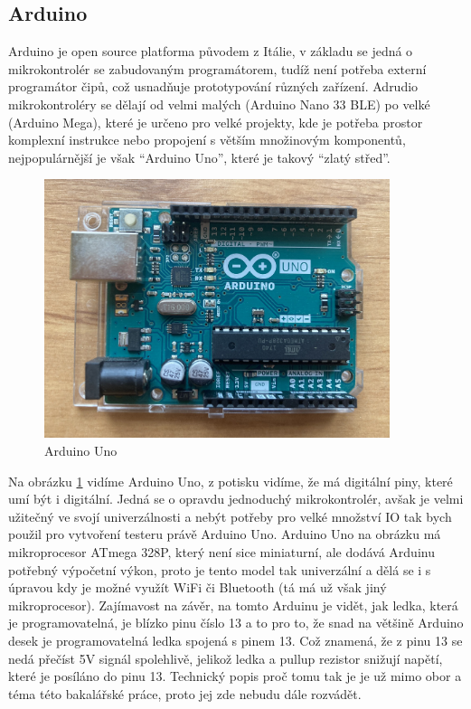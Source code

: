 
\subsection{Arduino}
Arduino je open source platforma původem z Itálie, v základu se jedná o mikrokontrolér se zabudovaným programátorem, tudíž není potřeba externí programátor čipů, což usnadňuje prototypování různých zařízení. Adrudio mikrokontroléry se dělají od velmi malých (Arduino Nano 33 BLE) po velké (Arduino Mega), které je určeno pro velké projekty, kde je potřeba prostor komplexní instrukce nebo propojení s větším množinovým komponentů, nejpopulárnější je však “Arduino Uno”, které je takový “zlatý střed”.

\begin{figure}[h!]
	\centering
	\includegraphics[width=0.9\textwidth]{pictures/arduino.jpeg}
    	\caption{Arduino Uno}
   	\label{fig:arduinoUno}
\end{figure}	

Na obrázku \ref{fig:arduinoUno} vidíme Arduino Uno, z potisku vidíme, že má digitální piny, které umí být i digitální. Jedná se o opravdu jednoduchý mikrokontrolér, avšak je velmi užitečný ve svojí univerzálnosti a nebýt potřeby pro velké množství IO tak bych použil pro vytvoření testeru právě Arduino Uno. Arduino Uno na obrázku má mikroprocesor ATmega 328P, který není sice miniaturní, ale dodává Arduinu potřebný výpočetní výkon, proto je tento model tak univerzální a dělá se i s úpravou kdy je možné využít WiFi či Bluetooth (tá má už však jiný mikroprocesor). Zajímavost na závěr, na tomto Arduinu je vidět, jak ledka, která je programovatelná, je blízko pinu číslo 13 a to pro to, že snad na většině Arduino desek je programovatelná ledka spojená s pinem 13. Což znamená, že z pinu 13 se nedá přečíst 5V signál spolehlivě, jelikož ledka a pullup rezistor snižují napětí, které je posíláno do pinu 13. Technický popis proč tomu tak je je už mimo obor a téma této bakalářské práce, proto jej zde nebudu dále rozvádět.